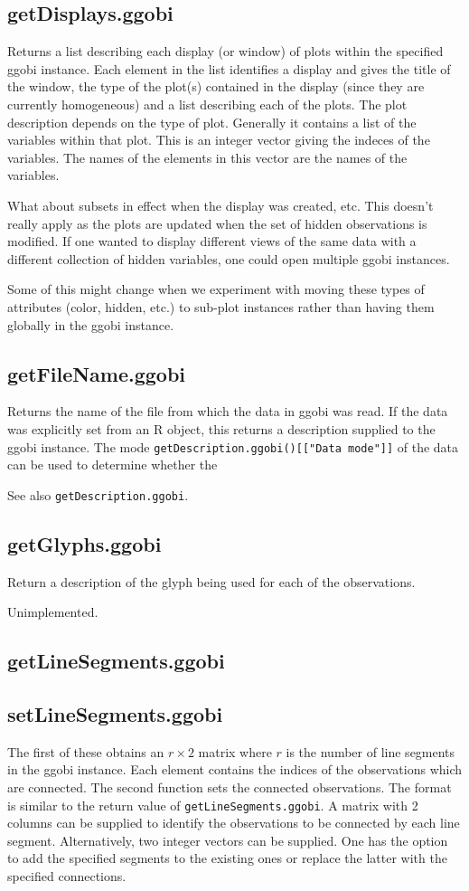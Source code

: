 \documentclass{article}
\def\SFunction#1{{\texttt{\red #1}}}
\begin{document}
\subsection{getDisplays.ggobi}
Returns a list describing each display (or window) of plots within the
specified ggobi instance.  Each element in the list identifies a
display and gives the title of the window, the type of the plot(s)
contained in the display (since they are currently homogeneous) and a
list describing each of the plots.  The plot description depends on
the type of plot. Generally it contains a list of the variables within
that plot.  This is an integer vector giving the indeces of the
variables. The names of the elements in this vector are the names of
the variables. 

What about subsets in effect when the display was created, etc.  This
doesn't really apply as the plots are updated when the set of hidden
observations is modified.  If one wanted to display different views of
the same data with a different collection of hidden variables, one
could open multiple ggobi instances.

Some of this might change when we experiment with moving these types
of attributes (color, hidden, etc.) to sub-plot instances rather than
having them globally in the ggobi instance.

\subsection{getFileName.ggobi}
Returns the name of the file from which the data in ggobi was read. If
the data was explicitly set from an R object, this returns a
description supplied to the ggobi instance. The mode
\SFunction{getDescription.ggobi()[["Data mode"]]} of the data can be
used to determine whether the

See also \SFunction{getDescription.ggobi}.

\subsection{getGlyphs.ggobi}
Return a description of the glyph
being used for each of the observations.

Unimplemented.

\subsection{getLineSegments.ggobi}
\subsection{setLineSegments.ggobi}
The first of these obtains an $r \times 2$ matrix where $r$ is the
number of line segments in the ggobi instance.  Each element contains
the indices of the observations which are connected.  The second
function sets the connected observations.  The format is similar to
the return value of \SFunction{getLineSegments.ggobi}.  A matrix with
2 columns can be supplied to identify the observations to be connected
by each line segment.  Alternatively, two integer vectors can be
supplied.  One has the option to add the specified segments to the
existing ones or replace the latter with the specified connections.
\end{document}
